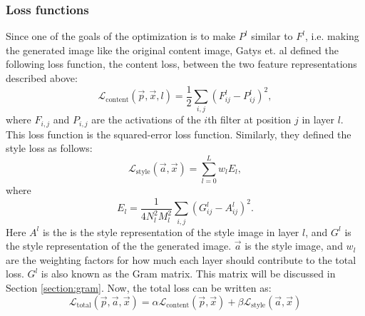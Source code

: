 \subsubsection{Loss functions}
Since one of the goals of the optimization is to make $P^l$ similar to $F^l$, i.e. making the generated image like the original content image, Gatys et. al defined the following loss function, the content loss, between the two feature representations described above:
\begin{equation}
    \mathcal{L}_\text{content}(\vec{p},\vec{x},l)=\frac{1}{2}\sum_{i,j}{(F_{ij}^l-P_{ij}^l)^2},
\end{equation}
where $F_{i,j}$ and $P_{i,j}$ are the activations of the $i$th filter at position $j$ in layer $l$. This loss function is the squared-error loss function. Similarly, they defined the style loss as follows:
\begin{equation}
    \mathcal{L}_\text{style}(\vec{a},\vec{x})=\sum_{l=0}^L{w_lE_l},
\end{equation}
where
\begin{equation}
    E_l=\frac{1}{4N_l^2M_l^2}\sum_{i,j}{(G_{ij}^l-A_{ij}^l)^2}.
\end{equation}
Here $A^l$ is the is the style representation of the style image in layer $l$, and $G^l$ is the style representation of the the generated image. $\vec{a}$ is the style image, and $w_l$ are the weighting factors for how much each layer should contribute to the total loss. $G^l$ is also known as the Gram matrix. This matrix will be discussed in Section \ref{section:gram}. Now, the total loss can be written as:
\begin{equation}
    \mathcal{L}_\text{total}(\vec{p}, \vec{a}, \vec{x})=\alpha\mathcal{L}_\text{content}(\vec{p},\vec{x})+\beta\mathcal{L}_\text{style}(\vec{a},\vec{x})
\end{equation}
